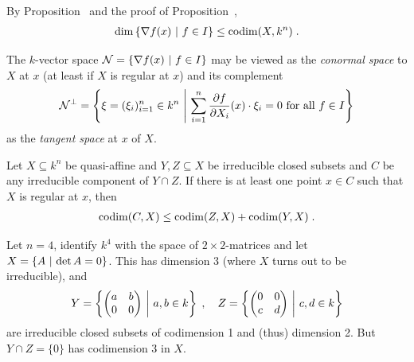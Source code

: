 \documentclass[a4paper,parskip=half,numbers=enddot, DIV=12]{scrreprt}
\begin{document}
		
\begin{rem*}
    By Proposition~ and the proof of Proposition~, 
    \begin{align*}
        \dim\left\{\nabla f(x)\ \middle|\  f\in I\right\} \leq \operatorname{codim}(X,k^n)\;.
    \end{align*}
\end{rem*}
\begin{rem}
    The $k$-vector space $\mathcal{N} = \left\{\nabla f(x) \ \middle|\  f\in I\right\}$ may be viewed as the \emph{conormal space} to $X$ at $x$ (at least if $X$ is regular at $x$) and its complement 
    \begin{align*}
        \mathcal{N}^\perp = \left\{ \xi = (\xi_i)_{i=1}^n \in k^n \ \middle|\  \sum_{i=1}^{n}\frac{\partial f}{\partial X_i}(x)\cdot\xi_i=0 \text{ for all } f\in I\right\}
    \end{align*}
    as the \emph{tangent space} at $x$ of $X$.
\end{rem}
\begin{thm}
    Let $X\subseteq k^n$ be quasi-affine and $Y,Z \subseteq X$ be irreducible closed subsets and $C$ be any irreducible component of $Y\cap Z$. If there is at least one point $x\in C$ such that $X$ is regular at $x$, then 
    \begin{align*}
    	\operatorname{codim}(C,X) \leq \operatorname{codim} (Z,X)+\operatorname{codim}(Y,X)\;.
    \end{align*}
\end{thm}
\begin{rem}
    Let $n=4$, identify $k^4$ with the space of $2\times 2$-matrices and let $X= \left\{ A\ \middle|\  \operatorname{det} A = 0\right\}$. This has dimension 3 (where $X$ turns out to be irreducible), and 
    \begin{align*}
        Y = \left\{\begin{pmatrix} a&b\\ 0&0\end{pmatrix} \ \middle|\  a,b\in k \right\}\;,\quad
        Z = \left\{\begin{pmatrix} 0&0\\ c&d\end{pmatrix} \ \middle|\  c,d\in k \right\}
    \end{align*}  
    are irreducible closed subsets of codimension 1 and (thus) dimension 2. But $Y\cap Z = \{0\}$ has codimension 3 in $X$.
\end{rem}
\end{document}
